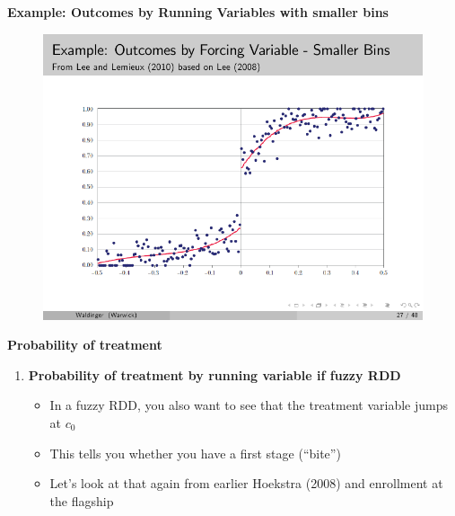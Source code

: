\documentclass[notes=show]{beamer}
\begin{document}
\begin{frame}[shrink=20,plain]
	\begin{center}
	\textbf{Example: Outcomes by Running Variables with smaller bins}
	\end{center}
	
	\begin{figure}
	\includegraphics[scale=1.05]{./lecture_includes/rdd_31.pdf}
	\end{figure}
	
\end{frame}

\begin{frame}[plain]
	\begin{center}
	\textbf{Probability of treatment}
	\end{center}
	
	\begin{enumerate}\addtocounter{enumi}{1}
	\item \textbf{Probability of treatment by running variable if fuzzy RDD}
		\begin{itemize}
		\item In a fuzzy RDD, you also want to see that the treatment variable jumps at $c_0$ 
		\item This tells you whether you have a first stage (``bite'')
		\item Let's look at that again from earlier Hoekstra (2008) and enrollment at the flagship
		\end{itemize}
	\end{enumerate}
\end{frame}
\end{document}
